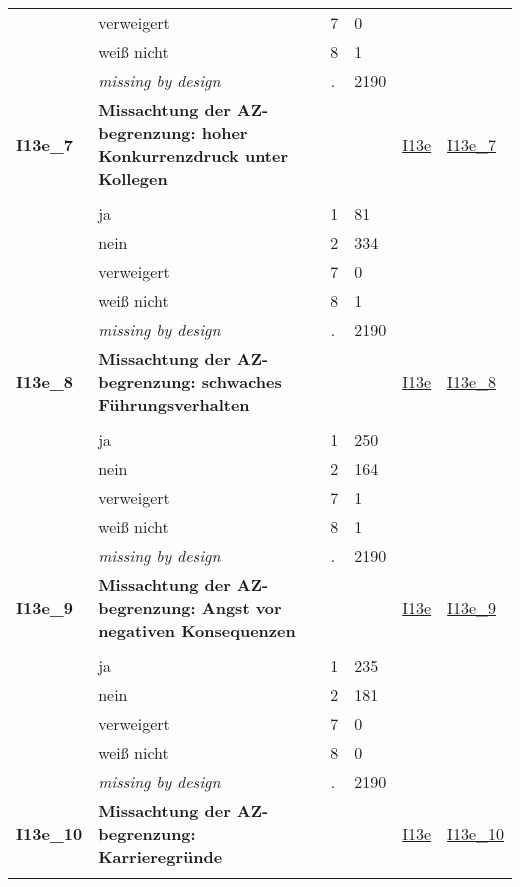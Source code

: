 \begin{longtable}{| L{2.45cm} | L{6cm} | C{1.5cm} | R{1cm} | C{2.25cm} | C{2.25cm} |}
   & verweigert & 7 & 0 &  &  \\ 
   & weiß nicht & 8 & 1 &  &  \\ 
   & \textit{missing by design} & \textit{.} & 2190 &  &  \\ 
   \midrule
\textbf{I13e\_7}\label{var:I13e:7} & \textbf{Missachtung der AZ-begrenzung: hoher Konkurrenzdruck unter Kollegen} &  &  & \hyperref[I13e]{I13e} & \hyperref[var:suf:I13e:7]{I13e\_7} \\ 
   &  &  &  &  &  \\ 
   & ja & 1 & 81 &  &  \\ 
   & nein & 2 & 334 &  &  \\ 
   & verweigert & 7 & 0 &  &  \\ 
   & weiß nicht & 8 & 1 &  &  \\ 
   & \textit{missing by design} & \textit{.} & 2190 &  &  \\ 
   \midrule
\textbf{I13e\_8}\label{var:I13e:8} & \textbf{Missachtung der AZ-begrenzung: schwaches Führungsverhalten} &  &  & \hyperref[I13e]{I13e} & \hyperref[var:suf:I13e:8]{I13e\_8} \\ 
   &  &  &  &  &  \\ 
   & ja & 1 & 250 &  &  \\ 
   & nein & 2 & 164 &  &  \\ 
   & verweigert & 7 & 1 &  &  \\ 
   & weiß nicht & 8 & 1 &  &  \\ 
   & \textit{missing by design} & \textit{.} & 2190 &  &  \\ 
   \midrule
\textbf{I13e\_9}\label{var:I13e:9} & \textbf{Missachtung der AZ-begrenzung: Angst vor negativen Konsequenzen} &  &  & \hyperref[I13e]{I13e} & \hyperref[var:suf:I13e:9]{I13e\_9} \\ 
   &  &  &  &  &  \\ 
   & ja & 1 & 235 &  &  \\ 
   & nein & 2 & 181 &  &  \\ 
   & verweigert & 7 & 0 &  &  \\ 
   & weiß nicht & 8 & 0 &  &  \\ 
   & \textit{missing by design} & \textit{.} & 2190 &  &  \\ 
   \midrule
\textbf{I13e\_10}\label{var:I13e:10} & \textbf{Missachtung der AZ-begrenzung: Karrieregründe} &  &  & \hyperref[I13e]{I13e} & \hyperref[var:suf:I13e:10]{I13e\_10} \\ 
   &  &  &  &  &  \\ 

\end{longtable}

